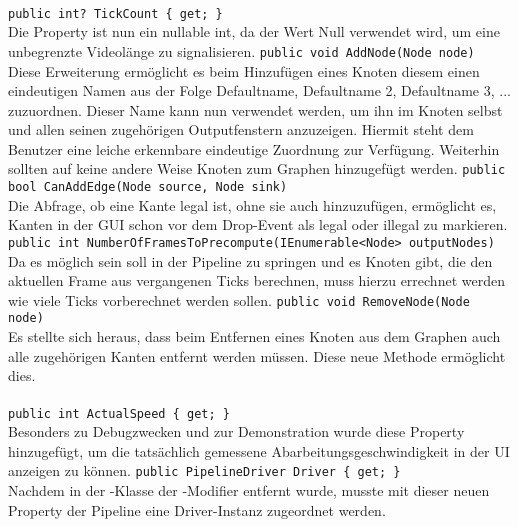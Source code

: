 \paragraph{}
\begin{itemize}
	\change \verb!public int? TickCount { get; }! \\
	Die Property ist nun ein nullable int, da der Wert Null verwendet wird, um eine unbegrenzte Videolänge zu signalisieren.
	\add \verb!public void AddNode(Node node)! \\
	Diese Erweiterung ermöglicht es beim Hinzufügen eines Knoten diesem einen eindeutigen Namen aus der Folge Defaultname, Defaultname 2, Defaultname 3, ... zuzuordnen. Dieser Name kann nun verwendet werden, um ihn im Knoten selbst und allen seinen zugehörigen Outputfenstern anzuzeigen. Hiermit steht dem Benutzer eine leiche erkennbare eindeutige Zuordnung zur Verfügung. Weiterhin sollten auf keine andere Weise Knoten zum Graphen hinzugefügt werden.
	\add \verb!public bool CanAddEdge(Node source, Node sink)! \\
	Die Abfrage, ob eine Kante legal ist, ohne sie auch hinzuzufügen, ermöglicht es, Kanten in der GUI schon vor dem Drop-Event als legal oder illegal zu markieren.
	\add \verb!public int NumberOfFramesToPrecompute(IEnumerable<Node> outputNodes)! \\
	Da es möglich sein soll in der Pipeline zu springen und es Knoten gibt, die den aktuellen Frame aus vergangenen Ticks berechnen, muss hierzu errechnet werden wie viele Ticks vorberechnet werden sollen.
	\add \verb!public void RemoveNode(Node node)! \\
	Es stellte sich heraus, dass beim Entfernen eines Knoten aus dem Graphen auch alle zugehörigen Kanten entfernt werden müssen. Diese neue Methode ermöglicht dies.
\end{itemize}

\paragraph{}
\begin{itemize}
	\add \verb!public int ActualSpeed { get; }! \\
	Besonders zu Debugzwecken und zur Demonstration wurde diese Property hinzugefügt, um die tatsächlich gemessene Abarbeitungsgeschwindigkeit in der UI anzeigen zu können.
	\add \verb!public PipelineDriver Driver { get; }! \\
	Nachdem in der -Klasse der -Modifier entfernt wurde, musste mit dieser neuen Property der Pipeline eine Driver-Instanz zugeordnet werden.
\end{itemize}


